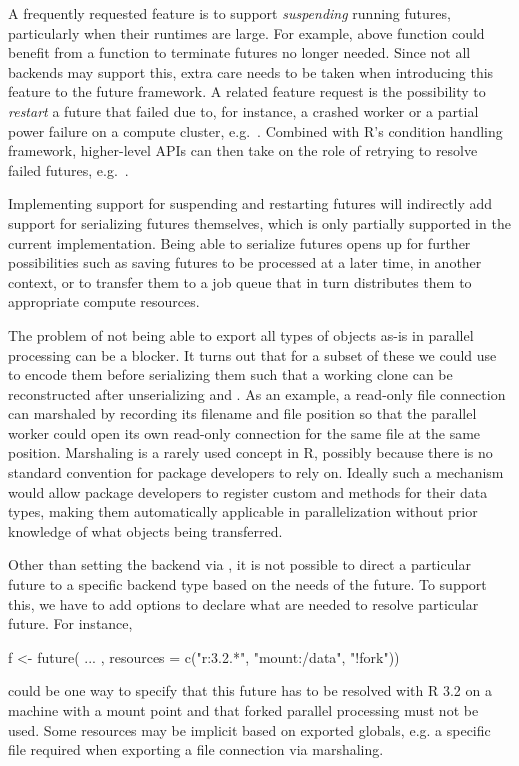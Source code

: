 A frequently requested feature is to support \emph{suspending} running
futures, particularly when their runtimes are large.  For example,
above  function could benefit from
a  function to terminate futures no longer needed.
Since not all backends may support
this, extra care needs to be taken when introducing this feature to
the future framework.  A related feature request is the possibility
to \emph{restart} a future that failed due to, for instance, a crashed
worker or a partial power failure on a compute cluster,
e.g.\ .  Combined with R's condition handling
framework, higher-level APIs can then take on the role of retrying to
resolve failed futures,
e.g.\ .

Implementing support for suspending and restarting futures will
indirectly add support for serializing futures themselves, which is
only partially supported in the current implementation.  Being able to
serialize futures opens up for further possibilities such as saving
futures to be processed at a later time, in another context, or to
transfer them to a job queue that in turn distributes them to
appropriate compute resources.

The problem of not being able to export all types of objects as-is in
parallel processing can be a blocker.  It turns out that for a subset
of these we could use  to encode them before
serializing them such that a working clone can be reconstructed after
unserializing and .  As an example, a read-only file
connection can marshaled by recording its filename and file position
so that the parallel worker could open its own read-only connection
for the same file at the same position.  Marshaling is a rarely used
concept in R, possibly because there is no standard convention for
package developers to rely on. Ideally such a mechanism would allow
package developers to register custom 
and  methods for their data types, making them
automatically applicable in parallelization without prior knowledge of
what objects being transferred.

Other than setting the backend via , it is not possible
to direct a particular future to a specific backend type based on the
needs of the future.  To support this, we have to add options to
declare what  are needed to resolve particular future.
For instance,
\begin{example}
f <- future({ ... }, resources = c("r:3.2.*", "mount:/data", "!fork"))
\end{example}
%
could be one way to specify that this future has to be resolved with R
3.2 on a machine with a  mount point and that forked
parallel processing must not be used.  Some resources may be implicit
based on exported globals, e.g. a specific file required when
exporting a file connection via marshaling.

